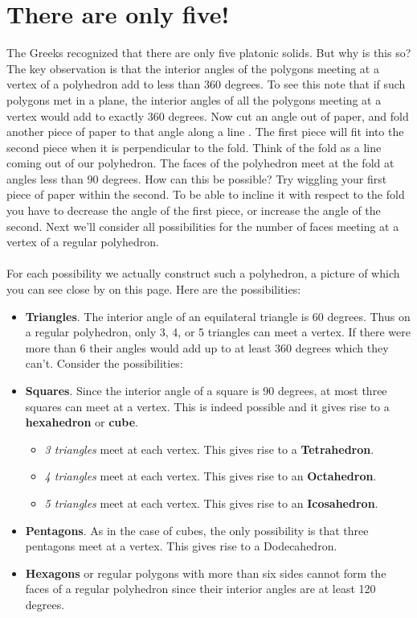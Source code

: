 \documentclass[openany,a4paper,12pt]{book}
\begin{document}
\section{There are only five!}
The Greeks recognized that there are only five platonic solids. But why is this so? The key observation is that the interior angles of the polygons meeting at a vertex of a polyhedron add to less than 360 degrees. To see this note that if such polygons met in a plane, the interior angles of all the polygons meeting at a vertex would add to exactly 360 degrees. Now cut an angle out of paper, and fold another piece of paper to that angle along a line \cite{smith96}. The first piece will fit into the second piece when it is perpendicular to the fold. Think of the fold as a line coming out of our polyhedron. The faces of the polyhedron meet at the fold at angles less than 90 degrees. How can this be possible? Try wiggling your first piece of paper within the second. To be able to incline it with respect to the fold you have to decrease the angle of the first piece, or increase the angle of the second. Next we'll consider all possibilities for the number of faces meeting at a vertex of a regular polyhedron.  \\\\
For each possibility we actually construct such a polyhedron, a picture of which you can see close by on this page. Here are the possibilities: 
\begin{itemize}
\item
\textbf{Triangles}. The interior angle of an equilateral triangle is 60 degrees. Thus on a regular polyhedron, only 3, 4, or 5 triangles can meet a vertex. If there were more than 6 their angles would add up to at least 360 degrees which they can't. Consider the possibilities: 
\item
\textbf{Squares}. Since the interior angle of a square is 90 degrees, at most three squares can meet at a vertex. This is indeed possible and it gives rise to a \textbf{hexahedron} or \textbf{cube}.
\begin{itemize}
\item[\Checkmark]
\textit{3 triangles} meet at each vertex. This gives rise to a \textbf{Tetrahedron}.
\item[\Checkmark]
\textit{4 triangles} meet at each vertex. This gives rise to an \textbf{Octahedron}.
\item[\Checkmark]
\textit{5 triangles} meet at each vertex. This gives rise to an \textbf{Icosahedron}.
\end{itemize}
\item
 \textbf{Pentagons}. As in the case of cubes, the only possibility is that three pentagons meet at a vertex. This gives rise to a Dodecahedron.
\item
 \textbf{Hexagons} or regular polygons with more than six sides cannot form the faces of a regular polyhedron since their interior angles are at least 120 degrees.
 \end{itemize}
\end{document}
